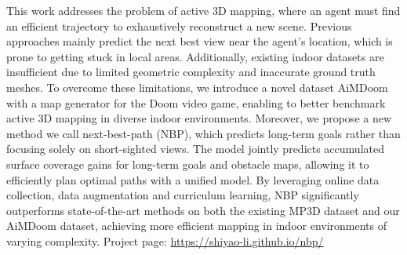 This work addresses the problem of active 3D mapping, where an agent must find an efficient trajectory to exhaustively reconstruct a new scene.
Previous approaches mainly predict the next best view near the agent's location, which is prone to getting stuck in local areas. Additionally, existing indoor datasets are insufficient due to limited geometric complexity and inaccurate ground truth meshes.
To overcome these limitations, we introduce a novel dataset AiMDoom with a map generator for the Doom video game, enabling to better benchmark active 3D mapping in diverse indoor environments.
Moreover, we propose a new method we call next-best-path (NBP), which predicts long-term goals rather than focusing solely on short-sighted views.
The model jointly predicts accumulated surface coverage gains for long-term goals and obstacle maps, allowing it to efficiently plan optimal paths with a unified model.
By leveraging online data collection, data augmentation and curriculum learning, NBP significantly outperforms state-of-the-art methods on both the existing MP3D dataset and our AiMDoom dataset, achieving more efficient mapping in indoor environments of varying complexity. 
Project page: \url{https://shiyao-li.github.io/nbp/}